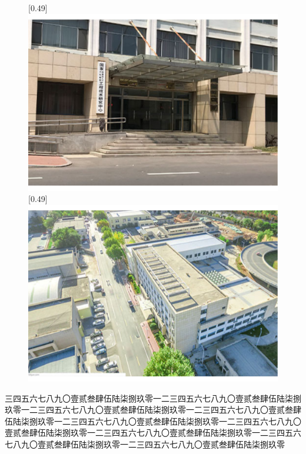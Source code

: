 \documentclass[master,academic]{ysuthesis} %
\begin{document}
\begin{figure}[!ht]
				[0.49\textwidth]{\includegraphics[scale=0.25]{国家创新人才培养示范基地.pdf}}
				[0.49\textwidth]{\includegraphics[scale=0.25]{国家冷轧板带装备及工艺工程技术研究中心.pdf}}
				\label{fig_bi_ysunationalbase}
			\end{figure}


		三四五六七八九〇壹贰叁肆伍陆柒捌玖零一二三四五六七八九〇壹贰叁肆伍陆柒捌玖零一二三四五六七八九〇壹贰叁肆伍陆柒捌玖零一二三四五六七八九〇壹贰叁肆伍陆柒捌玖零一二三四五六七八九〇壹贰叁肆伍陆柒捌玖零一二三四五六七八九〇壹贰叁肆伍陆柒捌玖零一二三四五六七八九〇壹贰叁肆伍陆柒捌玖零一二三四五六七八九〇壹贰叁肆伍陆柒捌玖零一二三四五六七八九〇壹贰叁肆伍陆柒捌玖零
\end{document}
